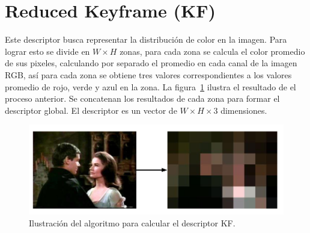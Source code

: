\section{Reduced Keyframe (KF)}\label{kfd}
Este descriptor busca representar la distribución de color en la imagen. Para lograr esto se divide en $W \times H$ zonas, para cada zona se calcula el color promedio de sus pixeles, calculando por separado el promedio en cada canal de la imagen RGB, así para cada zona se obtiene tres valores correspondientes a los valores promedio de rojo, verde y azul en la zona. La figura~\ref{descriptor_kf} ilustra el resultado de el proceso anterior.  Se concatenan los resultados de cada zona para formar el descriptor global. El descriptor es un vector de $W \times H \times 3$ dimensiones.
    \begin{figure}[!h]
		\centering
		\includegraphics[scale=0.4]{imagenes/cap3/descriptor_kf.png}
		\caption{Ilustración del algoritmo para calcular el descriptor KF.}
		\label{descriptor_kf}
	\end{figure}

